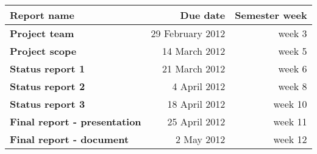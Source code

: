 \documentclass[12pt]{article}
\begin{document}
\begin{tabular}{|l|r|r|}
\hline
\bf{Report name} & \bf{Due date} & \bf{Semester week} \\
\hline
\hline
{\bf Project team                } & 29 February 2012 & week 3 \\
{\bf Project scope               } & 14 March 2012 & week 5 \\
{\bf Status report 1             } & 21 March 2012 & week 6 \\
{\bf Status report 2             } & 4 April 2012 & week 8 \\
{\bf Status report 3             } & 18 April 2012 & week 10 \\
{\bf Final report - presentation } & 25 April 2012 & week 11 \\
{\bf Final report - document     } & 2 May 2012 & week 12 \\
\hline
\end{tabular}
\end{document}
